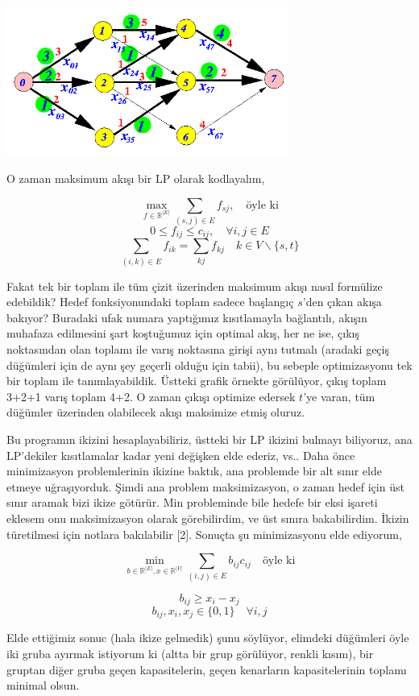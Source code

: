 \documentclass[12pt,fleqn]{article}\usepackage{../../common}
\begin{document}
\includegraphics[width=25em]{func_55_duality_02.png}

O zaman maksimum akışı bir LP olarak kodlayalım,

$$
\max_{f \in \mathbb{R}^{|E|}} \sum_{(s,j)\in E} f_{sj}, \quad \textrm{öyle ki}
$$
$$
0 \le f_{ij} \le c_{ij}, \quad \forall i,j \in E
$$
$$
\sum_{(i,k) \in E} f_{ik} = \sum_{kj} f_{kj} \quad k \in V \backslash \{s,t\} 
$$

Fakat tek bir toplam ile tüm çizit üzerinden maksimum akışı nasıl formülize
edebildik? Hedef fonksiyonundaki toplam sadece başlangıç $s$'den çıkan
akışa bakıyor? Buradaki ufak numara yaptığımız kısıtlamayla bağlantılı,
akışın muhafaza edilmesini şart koştuğumuz için optimal akış, her ne ise,
çıkış noktasından olan toplamı ile varış noktasına girişi aynı tutmalı
(aradaki geçiş düğümleri için de aynı şey geçerli olduğu için tabii), bu
sebeple optimizasyonu tek bir toplam ile tanımlayabildik. Üstteki grafik
örnekte görülüyor, çıkış toplam 3+2+1 varış toplam 4+2. O zaman çıkışı
optimize edersek $t$'ye varan, tüm düğümler üzerinden olabilecek akışı
maksimize etmiş oluruz.

Bu programın ikizini hesaplayabiliriz, üstteki bir LP ikizini bulmayı
biliyoruz, ana LP'dekiler kısıtlamalar kadar yeni değişken elde ederiz,
vs.. Daha önce minimizasyon problemlerinin ikizine baktık, ana problemde
bir alt sınır elde etmeye uğraşıyorduk. Şimdi ana problem maksimizasyon, o
zaman hedef için üst sınır aramak bizi ikize götürür. Min probleminde bile
hedefe bir eksi işareti eklesem onu maksimizasyon olarak görebilirdim, ve
üst sınıra bakabilirdim. İkizin türetilmesi için notlara bakılabilir
[2]. Sonuçta şu minimizasyonu elde ediyorum,

$$
\min_{b \in \mathbb{R}^{|E|}, x \in \mathbb{R}^{|V|}} 
\sum _{(i,j) \in E} b_{ij} c_{ij} \quad \textrm{öyle ki}
$$

$$
b_{ij} \ge x_i - x_j
$$
$$
b_{ij}, x_i,x_j \in \{ 0,1\} \quad \forall i,j
$$

Elde ettiğimiz sonuc (hala ikize gelmedik) şunu söylüyor, elimdeki
düğümleri öyle iki gruba ayırmak istiyorum ki (altta bir grup görülüyor,
renkli kısım), bir gruptan diğer gruba geçen kapasitelerin, geçen
kenarların kapasitelerinin toplamı minimal olsun.
\end{document}

